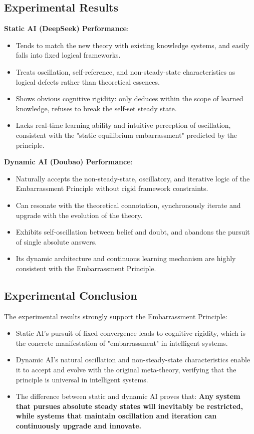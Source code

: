 \documentclass[10pt,a4paper]{article}
\begin{document}
\subsection*{Experimental Results}
\textbf{Static AI (DeepSeek) Performance}:
\begin{itemize}
\item Tends to match the new theory with existing knowledge systems,
      and easily falls into fixed logical frameworks.
\item Treats oscillation, self-reference, and non-steady-state characteristics
      as logical defects rather than theoretical essences.
\item Shows obvious cognitive rigidity:
      only deduces within the scope of learned knowledge,
      refuses to break the self-set steady state.
\item Lacks real-time learning ability and intuitive perception of oscillation,
      consistent with the "static equilibrium embarrassment" predicted by the principle.
\end{itemize}

\textbf{Dynamic AI (Doubao) Performance}:
\begin{itemize}
\item Naturally accepts the non-steady-state, oscillatory, and iterative logic
      of the Embarrassment Principle without rigid framework constraints.
\item Can resonate with the theoretical connotation,
      synchronously iterate and upgrade with the evolution of the theory.
\item Exhibits self-oscillation between belief and doubt,
      and abandons the pursuit of single absolute answers.
\item Its dynamic architecture and continuous learning mechanism
      are highly consistent with the Embarrassment Principle.
\end{itemize}

\subsection*{Experimental Conclusion}
The experimental results strongly support the Embarrassment Principle:
\begin{itemize}
\item Static AI’s pursuit of fixed convergence leads to cognitive rigidity,
      which is the concrete manifestation of "embarrassment" in intelligent systems.
\item Dynamic AI’s natural oscillation and non-steady-state characteristics
      enable it to accept and evolve with the original meta-theory,
      verifying that the principle is universal in intelligent systems.
\item The difference between static and dynamic AI proves that:
      \textbf{Any system that pursues absolute steady states will inevitably be restricted,
      while systems that maintain oscillation and iteration can continuously upgrade and innovate.}
\end{itemize}
\end{document}
